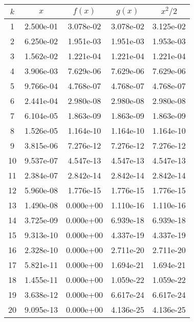 \begin{tabular}{ccccc}
\toprule
 $k$ &       $x$ &    $f(x)$ &    $g(x)$ &   $x^2/2$ \\
\midrule
   1 & 2.500e-01 & 3.078e-02 & 3.078e-02 & 3.125e-02 \\
   2 & 6.250e-02 & 1.951e-03 & 1.951e-03 & 1.953e-03 \\
   3 & 1.562e-02 & 1.221e-04 & 1.221e-04 & 1.221e-04 \\
   4 & 3.906e-03 & 7.629e-06 & 7.629e-06 & 7.629e-06 \\
   5 & 9.766e-04 & 4.768e-07 & 4.768e-07 & 4.768e-07 \\
   6 & 2.441e-04 & 2.980e-08 & 2.980e-08 & 2.980e-08 \\
   7 & 6.104e-05 & 1.863e-09 & 1.863e-09 & 1.863e-09 \\
   8 & 1.526e-05 & 1.164e-10 & 1.164e-10 & 1.164e-10 \\
   9 & 3.815e-06 & 7.276e-12 & 7.276e-12 & 7.276e-12 \\
  10 & 9.537e-07 & 4.547e-13 & 4.547e-13 & 4.547e-13 \\
  11 & 2.384e-07 & 2.842e-14 & 2.842e-14 & 2.842e-14 \\
  12 & 5.960e-08 & 1.776e-15 & 1.776e-15 & 1.776e-15 \\
  13 & 1.490e-08 & 0.000e+00 & 1.110e-16 & 1.110e-16 \\
  14 & 3.725e-09 & 0.000e+00 & 6.939e-18 & 6.939e-18 \\
  15 & 9.313e-10 & 0.000e+00 & 4.337e-19 & 4.337e-19 \\
  16 & 2.328e-10 & 0.000e+00 & 2.711e-20 & 2.711e-20 \\
  17 & 5.821e-11 & 0.000e+00 & 1.694e-21 & 1.694e-21 \\
  18 & 1.455e-11 & 0.000e+00 & 1.059e-22 & 1.059e-22 \\
  19 & 3.638e-12 & 0.000e+00 & 6.617e-24 & 6.617e-24 \\
  20 & 9.095e-13 & 0.000e+00 & 4.136e-25 & 4.136e-25 \\
\bottomrule
\end{tabular}
